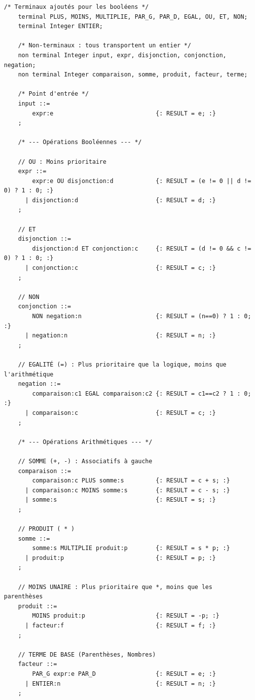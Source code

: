 \documentclass{td}
\begin{document}
\begin{corrections}
  \begin{lstlisting}[gobble=4]
    /* Terminaux ajoutés pour les booléens */
    terminal PLUS, MOINS, MULTIPLIE, PAR_G, PAR_D, EGAL, OU, ET, NON;
    terminal Integer ENTIER;
     
    /* Non-terminaux : tous transportent un entier */
    non terminal Integer input, expr, disjonction, conjonction, negation;
    non terminal Integer comparaison, somme, produit, facteur, terme;
          
    /* Point d'entrée */
    input ::=
        expr:e                             {: RESULT = e; :}
    ;
     
    /* --- Opérations Booléennes --- */
     
    // OU : Moins prioritaire
    expr ::=
        expr:e OU disjonction:d            {: RESULT = (e != 0 || d != 0) ? 1 : 0; :}
      | disjonction:d                      {: RESULT = d; :}
    ;
     
    // ET
    disjonction ::=
        disjonction:d ET conjonction:c     {: RESULT = (d != 0 && c != 0) ? 1 : 0; :}
      | conjonction:c                      {: RESULT = c; :}
    ;
     
    // NON
    conjonction ::=
        NON negation:n                     {: RESULT = (n==0) ? 1 : 0; :}
      | negation:n                         {: RESULT = n; :}
    ;
     
    // EGALITÉ (=) : Plus prioritaire que la logique, moins que l'arithmétique
    negation ::=
        comparaison:c1 EGAL comparaison:c2 {: RESULT = c1==c2 ? 1 : 0; :}
      | comparaison:c                      {: RESULT = c; :}
    ;
     
    /* --- Opérations Arithmétiques --- */
     
    // SOMME (+, -) : Associatifs à gauche
    comparaison ::=
        comparaison:c PLUS somme:s         {: RESULT = c + s; :}
      | comparaison:c MOINS somme:s        {: RESULT = c - s; :}
      | somme:s                            {: RESULT = s; :}
    ;
     
    // PRODUIT ( * )
    somme ::=
        somme:s MULTIPLIE produit:p        {: RESULT = s * p; :}
      | produit:p                          {: RESULT = p; :}
    ;
     
    // MOINS UNAIRE : Plus prioritaire que *, moins que les parenthèses
    produit ::=
        MOINS produit:p                    {: RESULT = -p; :}
      | facteur:f                          {: RESULT = f; :}
    ;
     
    // TERME DE BASE (Parenthèses, Nombres)
    facteur ::=
        PAR_G expr:e PAR_D                 {: RESULT = e; :}
      | ENTIER:n                           {: RESULT = n; :}
    ;
  \end{lstlisting}
\end{corrections}
\end{document}
